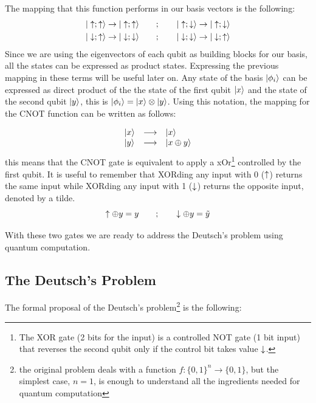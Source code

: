 The mapping that this function performs in our basis vectors is the following:
\begin{equation}
  \begin{split}
    &|\uparrow;\uparrow\rangle\rightarrow|\uparrow;\uparrow\rangle \quad\quad;\quad\quad
    |\uparrow;\downarrow\rangle\rightarrow|\uparrow;\downarrow\rangle\\
    &|\downarrow;\uparrow\rangle\rightarrow|\downarrow;\downarrow\rangle \quad\quad;\quad\quad
    |\downarrow;\downarrow\rangle\rightarrow|\downarrow;\uparrow\rangle
  \end{split}
\end{equation}
Since we are using the eigenvectors of each qubit as building blocks for our basis, all the states can be expressed as product states. Expressing the previous mapping in these terms will be useful later on.
Any state of the basis $|\phi_i\rangle$ can be expressed as direct product of the the state of the first qubit $|x\rangle$ and the state of the second qubit $|y\rangle$, this is  $|\phi_i\rangle=|x\rangle\otimes|y\rangle$.
Using this notation, the mapping for the CNOT function can be written as follows:

\begin{equation}
  \begin{array}{lcl}
    |x\rangle & \longrightarrow & |x\rangle \\
    |y\rangle & \longrightarrow & |x\oplus y\rangle
  \end{array}
\end{equation}
this means that the CNOT gate is equivalent to apply a \ac{xOr}\footnote{The XOR gate (2 bits for the input) is a controlled NOT gate (1 bit input) that reverses the second qubit only if the control bit takes value $\downarrow$.} controlled by the first qubit. It is useful to remember that XORding any input with 0 ($\uparrow$) returns the same input while XORding any input with 1 ($\downarrow$) returns the opposite input, denoted by a tilde.
\begin{equation}
  \uparrow\oplus y = y \quad\quad;\quad\quad \downarrow\oplus y = \tilde{y}
\end{equation}

With these two gates we are ready to address the Deutsch's problem using quantum computation.

\subsection{The Deutsch's Problem}
The formal proposal of the Deutsch's problem\footnote{the original problem deals with a function $f:\{ 0,1\}^n\rightarrow\{ 0,1\}$, but the simplest case, $n=1$, is enough to understand all the ingredients needed for quantum computation} is the following:\\

